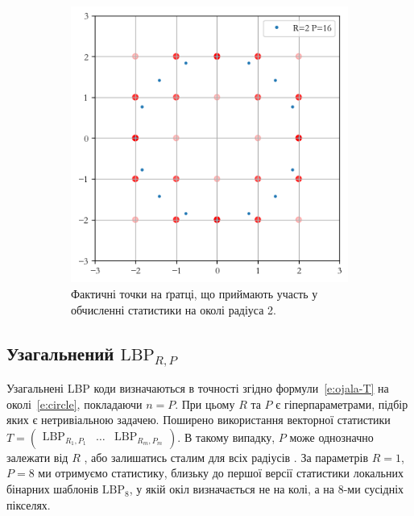 \begin{figure}[h]
\begin{subfigure}{0.48\textwidth}
    \includegraphics[width=0.9\linewidth]{img/clique-2-interp.png}
    \caption{
        Фактичні точки на ґратці, що приймають участь у обчисленні статистики на околі радіуса 2.
    }
    \label{subfig:clique-2b}
    \end{subfigure}
    
    \caption{}
    \label{fig:clique-2}
\end{figure}

\subsection{Узагальнений \(\mathrm{LBP}_{R,P}\)}\label{section1.1a}\hfill

Узагальнені LBP коди \cite{ojala2002} визначаються в точності згідно формули~\eqref{e:ojala-T} на околі~\eqref{e:circle}, покладаючи $n=P$.
При цьому $R$ та $P$ є гіперпараметрами, підбір яких є нетривіальною задачею.
Поширено використання векторної статистики $T = \begin{pmatrix}
    \mathrm{LBP}_{R_1,P_1} & \dots  & \mathrm{LBP}_{R_m,P_m}
\end{pmatrix}$. В такому випадку, $P$ може однозначно залежати від $R$ \cite{fastlbp2024}, або залишатись сталим для всіх радіусів \cite{huawudeng2004}.
За параметрів $R=1$, $P=8$ ми отримуємо статистику, близьку до першої версії статистики локальних бінарних шаблонів $\mathrm{LBP}_8$, у якій окіл визначається не на колі, а на 8-ми сусідніх пікселях.

